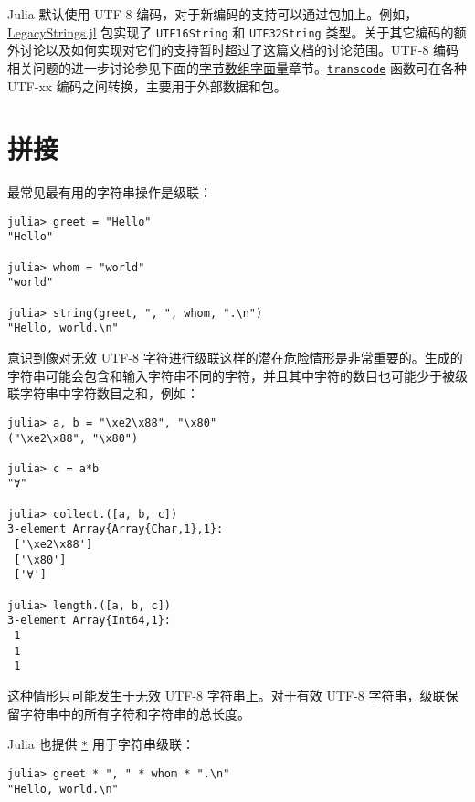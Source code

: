 Julia 默认使用 UTF-8 编码，对于新编码的支持可以通过包加上。例如，\href{https://github.com/JuliaStrings/LegacyStrings.jl}{LegacyStrings.jl} 包实现了 \texttt{UTF16String} 和 \texttt{UTF32String} 类型。关于其它编码的额外讨论以及如何实现对它们的支持暂时超过了这篇文档的讨论范围。UTF-8 编码相关问题的进一步讨论参见下面的\href{@ref man-byte-array-literals}{字节数组字面量}章节。\hyperlink{11147209877072452260}{\texttt{transcode}} 函数可在各种 UTF-xx 编码之间转换，主要用于外部数据和包。



\hypertarget{3486870924145745190}{}


\section{拼接}



最常见最有用的字符串操作是级联：




\begin{verbatim}
julia> greet = "Hello"
"Hello"

julia> whom = "world"
"world"

julia> string(greet, ", ", whom, ".\n")
"Hello, world.\n"
\end{verbatim}



意识到像对无效 UTF-8 字符进行级联这样的潜在危险情形是非常重要的。生成的字符串可能会包含和输入字符串不同的字符，并且其中字符的数目也可能少于被级联字符串中字符数目之和，例如：




\begin{verbatim}
julia> a, b = "\xe2\x88", "\x80"
("\xe2\x88", "\x80")

julia> c = a*b
"∀"

julia> collect.([a, b, c])
3-element Array{Array{Char,1},1}:
 ['\xe2\x88']
 ['\x80']
 ['∀']

julia> length.([a, b, c])
3-element Array{Int64,1}:
 1
 1
 1
\end{verbatim}



这种情形只可能发生于无效 UTF-8 字符串上。对于有效 UTF-8 字符串，级联保留字符串中的所有字符和字符串的总长度。



Julia 也提供 \hyperlink{7592762607639177347}{\texttt{*}} 用于字符串级联：




\begin{verbatim}
julia> greet * ", " * whom * ".\n"
"Hello, world.\n"
\end{verbatim}



